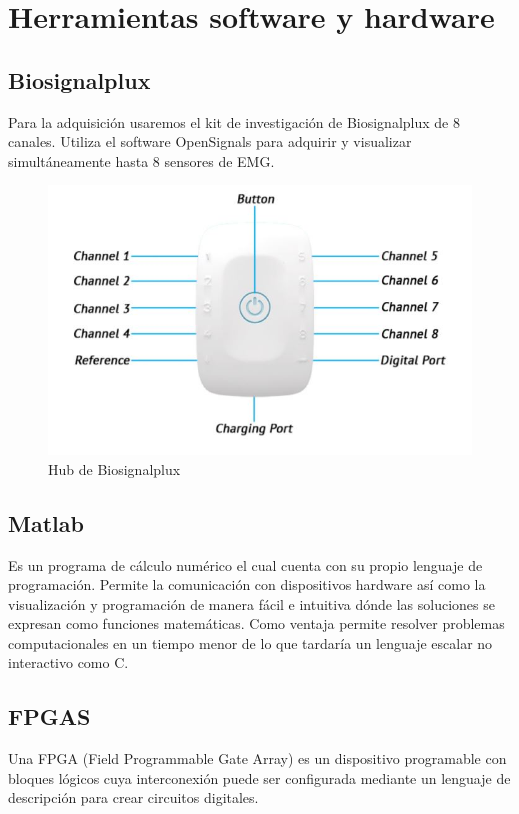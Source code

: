 \chapter{Herramientas software y hardware}\label{sec:Herramienta_software _y _hardware}
\section{Biosignalplux}
Para la adquisición usaremos el kit de investigación de Biosignalplux de 8 canales. Utiliza el software OpenSignals para adquirir y visualizar simultáneamente hasta 8 sensores de EMG. \newline
\begin{figure}[H]
	\center
	\includegraphics[scale=0.8]{imagenes/Herramientas/Bios.jpg}
	\caption{Hub de Biosignalplux}
	\label{fig:Biosignalplux}
\end{figure}
 
\section{Matlab}
Es un programa de cálculo numérico el cual cuenta con su propio lenguaje de programación. Permite la comunicación con dispositivos hardware así como la visualización y programación de manera fácil e intuitiva dónde las soluciones se expresan como funciones matemáticas. Como ventaja permite resolver problemas computacionales en un tiempo menor de lo que tardaría un lenguaje escalar no interactivo como C. \newline
\section{FPGAS}
Una FPGA (Field Programmable Gate Array) es un dispositivo programable con bloques lógicos cuya interconexión puede ser configurada mediante un lenguaje de descripción para crear circuitos digitales.\newline

